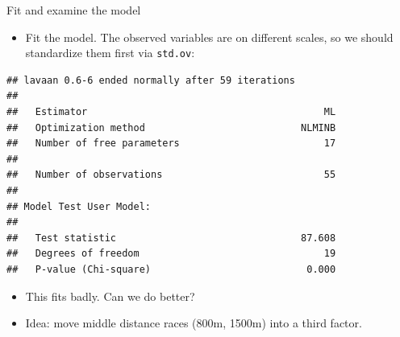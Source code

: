 \documentclass[
  ignorenonframetext,
]{beamer}
\newenvironment{Shaded}{\begin{snugshade}}{\end{snugshade}}
\newcommand{\DataTypeTok}[1]{\textcolor[rgb]{0.13,0.29,0.53}{#1}}
\newcommand{\FloatTok}[1]{\textcolor[rgb]{0.00,0.00,0.81}{#1}}
\newcommand{\KeywordTok}[1]{\textcolor[rgb]{0.13,0.29,0.53}{\textbf{#1}}}
\newcommand{\NormalTok}[1]{#1}
\newcommand{\OperatorTok}[1]{\textcolor[rgb]{0.81,0.36,0.00}{\textbf{#1}}}
\newcommand{\StringTok}[1]{\textcolor[rgb]{0.31,0.60,0.02}{#1}}
\providecommand{\tightlist}{%
  \setlength{\itemsep}{0pt}\setlength{\parskip}{0pt}}
\begin{document}
\begin{frame}[fragile]{Fit and examine the model}
\protect\hypertarget{fit-and-examine-the-model}{}

\begin{itemize}
\tightlist
\item
  Fit the model. The observed variables are on different scales, so we
  should standardize them first via \texttt{std.ov}:
\end{itemize}

\scriptsize

\begin{Shaded}
\end{Shaded}

\begin{verbatim}
## lavaan 0.6-6 ended normally after 59 iterations
## 
##   Estimator                                         ML
##   Optimization method                           NLMINB
##   Number of free parameters                         17
##                                                       
##   Number of observations                            55
##                                                       
## Model Test User Model:
##                                                       
##   Test statistic                                87.608
##   Degrees of freedom                                19
##   P-value (Chi-square)                           0.000
\end{verbatim}

\normalsize

\begin{itemize}
\item
  This fits badly. Can we do better?
\item
  Idea: move middle distance races (800m, 1500m) into a third factor.
\end{itemize}

\end{frame}
\end{document}
